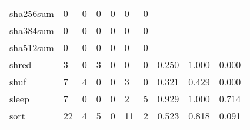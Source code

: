 \begin{longtable}{lp{2.0cm}p{2.0cm}p{2.0cm}p{2.0cm}p{2.0cm}p{2.0cm}p{2.0cm}p{2.0cm}p{2.0cm}}
sha256sum &                      0 &                                  0 &                                 0 &                                0 &                                 0 &                               0 &                                    - &                                      - &                                    - \\
sha384sum &                      0 &                                  0 &                                 0 &                                0 &                                 0 &                               0 &                                    - &                                      - &                                    - \\
sha512sum &                      0 &                                  0 &                                 0 &                                0 &                                 0 &                               0 &                                    - &                                      - &                                    - \\
shred     &                      3 &                                  0 &                                 3 &                                0 &                                 0 &                               0 &                                0.250 &                                  1.000 &                                0.000 \\
shuf      &                      7 &                                  4 &                                 0 &                                0 &                                 3 &                               0 &                                0.321 &                                  0.429 &                                0.000 \\
sleep     &                      7 &                                  0 &                                 0 &                                0 &                                 2 &                               5 &                                0.929 &                                  1.000 &                                0.714 \\
sort      &                     22 &                                  4 &                                 5 &                                0 &                                11 &                               2 &                                0.523 &                                  0.818 &                                0.091 \\

\end{longtable}
